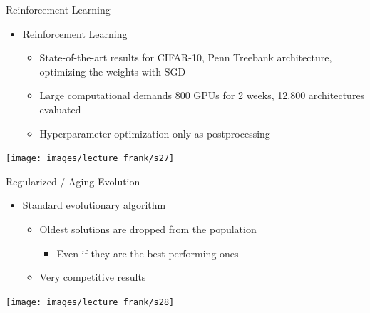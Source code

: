 {
\begin{frame}[c]{Reinforcement Learning}
\begin{itemize}
	\item Reinforcement Learning 
	\begin{itemize}
		\item State-of-the-art results for CIFAR-10, Penn Treebank
		architecture, optimizing the weights with SGD
		\item Large computational demands \alert{800 GPUs for 2 weeks, 12.800 architectures evaluated}
		\item Hyperparameter optimization only as postprocessing
	\end{itemize}
\end{itemize}

{\centering
	\texttt{[image: images/lecture\_frank/s27]}
}
\end{frame}
}
\begin{frame}[c]{Regularized / Aging Evolution}
\begin{itemize}
	\item Standard evolutionary algorithm 
	\begin{itemize}
		\item Oldest solutions are dropped from the population
		\begin{itemize}
			\item Even if they are the best performing ones
		\end{itemize}
		\item Very competitive results
	\end{itemize}
\end{itemize}

{\centering \hspace*{2.5cm}
	\texttt{[image: images/lecture\_frank/s28]}
}
\end{frame}
